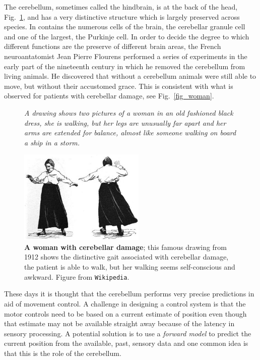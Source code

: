 \documentclass[12pt]{article}
\begin{document}
The cerebellum, sometimes called the hindbrain, is at the back of the
head, Fig.~\ref{fig_cerebellum}, and has a very distinctive structure
which is largely preserved across species. In contains the numerous
cells of the brain, the cerebellar granule cell and one of the
largest, the Purkinje cell. In order to decide the degree to which
different functions are the preserve of different brain areas, the
French neuroantatomist Jean Pierre Flourens performed a series of
experiments in the early part of the nineteenth century in which he
removed the cerebellum from living animals. He discovered that without
a cerebellum animals were still able to move, but without their
accustomed grace. This is consistent with what is observed for
patients with cerebellar damage, see Fig.~\ref{fig_woman}.

\begin{figure}[tbhp]
{\textsl{A drawing shows two pictures of a woman in an old fashioned black dress, she is walking, but her legs are unusually far apart and her arms are extended for balance, almost like someone walking on board a ship in a storm.}}
{
  \begin{center}
\includegraphics[width=6cm]{woman.png}
  \end{center}
  }
  \caption{\textbf{A woman with cerebellar damage}; this famous
    drawing from 1912 shows the distinctive gait associated with
    cerebellar damage, the patient is able to walk, but her walking
    seems self-conscious and awkward. Figure from
    \texttt{Wikipedia}.\label{fig_cerebellum}}
\end{figure}

These days it is thought that the cerebellum performs very precise
predictions in aid of movement control. A challenge in designing a control system is that the
motor controls need to be based on a current estimate of position even
though that estimate may not be available straight away because of the
latency in sensory processing. A potential solution is to use a
\textsl{forward model} to predict the current position from the
available, past, sensory data and one common idea is that this is the
role of the cerebellum.
\end{document}
